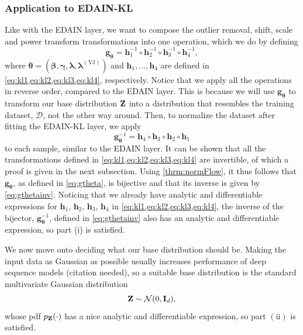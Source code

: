 \documentclass{statsmsc}
\begin{document}
{\subsubsection{Application to EDAIN-KL}%
\label{ssub:Application to EDAIN-KL}

Like with the \ac{EDAIN} layer, we want to compose the outlier removal, shift, scale and power
transform transformations into one operation, which we do by defining
\begin{equation}\label{eq:gtheta}
    \mathbf{g}_{\bm\theta}=\mathbf{h}_1^{-1} \circ  \mathbf{h}_2^{-1} \circ \mathbf{h}_3^{-1} \circ \mathbf{h}_4^{-1},
\end{equation}
where $\bm\theta=(\bm\beta, \bm\gamma, \bm\lambda, \bm\lambda^{(\textrm{YJ})})$ and
$\mathbf{h}_1,\dots,\mathbf{h}_4$ are defined in \cref{eq:kl1,eq:kl2,eq:kl3,eq:kl4}, respectively.
Notice that we apply all the operations in reverse order, compared to the \ac{EDAIN} layer. This
is because we will use $\mathbf{g}_{\bm\theta}$ to transform our base distribution $\mathbf{Z}$ into
a distribution that resembles the training dataset, $\mathcal{D}$, not the other way around.
Then, to normalize the dataset after fitting the \ac{EDAIN-KL} layer, we apply
\begin{equation}\label{eq:gthetainv}
    \mathbf{g}_{\bm\theta}^{-1}=\mathbf{h}_4 \circ \mathbf{h}_3 \circ \mathbf{h}_2 \circ \mathbf{h}_1
\end{equation}
to each sample, similar to the \ac{EDAIN} layer.
It can be shown that all the transformations defined in
\cref{eq:kl1,eq:kl2,eq:kl3,eq:kl4} are invertible, of which a proof is given in
the next subsection.
Using \cref{thrm:normFlow}, it thus follows that
$\mathbf{g}_{\bm\theta}$, as defined in \cref{eq:gtheta}, is bijective and that its inverse
is given by \cref{eq:gthetainv}. Noticing that we already have analytic and differentiable
expressions for $\mathbf{h}_1$, $\mathbf{h}_2$, $\mathbf{h}_3$, $\mathbf{h}_4$ in
\cref{eq:kl1,eq:kl2,eq:kl3,eq:kl4}, the inverse of the bijector, $\mathbf{g}_{\bm\theta}^{-1}$,
defined in \cref{eq:gthetainv} also has an analytic and differentiable expression, so part
(i) is satisfied.

We now move onto deciding what our base distribution should be.
Making the input data as Gaussian as possible usually increases performance of deep sequence models
(citation needed), so a suitable base distribution is the standard multivariate Gaussian distribution
\begin{equation}
    \mathbf{Z} \sim \mathcal{N}(0, \mathbf{I}_d),
\end{equation}
whose \ac{pdf} $p_{\mathbf{Z}}(\cdot)$
has a nice analytic and differentiable expression, so part $(\textrm{ii})$ is satisfied.

}
\end{document}
